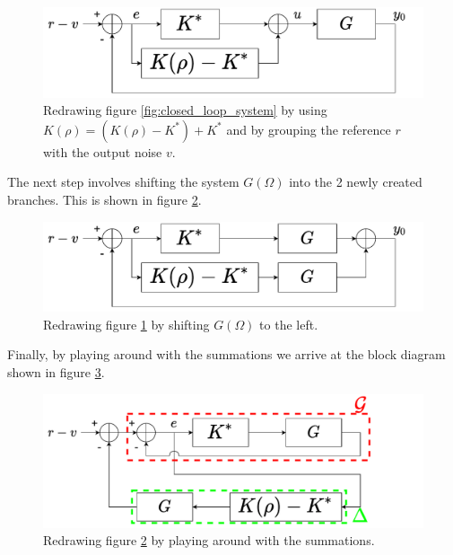\begin{figure}[H]
\centering
\includegraphics[scale=0.6]{figures/small_gain_CL1}
\caption{Redrawing figure \ref{fig:closed_loop_system} by using $K(\rho) = (K(\rho) - K^*) + K^*$ and by grouping the reference $r$ with the output noise $v$.}
\label{fig:small_gain_CL1}
\end{figure}

The next step involves shifting the system $G(\Omega)$ into the 2 newly created branches. This is shown in figure \ref{fig:small_gain_CL2}.
 
\begin{figure}[H]
\centering
\includegraphics[scale=0.6]{figures/small_gain_CL2}
\caption{Redrawing figure \ref{fig:small_gain_CL1} by shifting $G(\Omega)$ to the left.}
\label{fig:small_gain_CL2}
\end{figure}

Finally, by playing around with the summations we arrive at the block diagram shown in figure \ref{fig:small_gain_CL3}.
\begin{figure}[H]
\centering
\includegraphics[scale=0.6]{figures/small_gain_CL3}
\caption{Redrawing figure \ref{fig:small_gain_CL2} by playing around with the summations.}
\label{fig:small_gain_CL3}
\end{figure}



